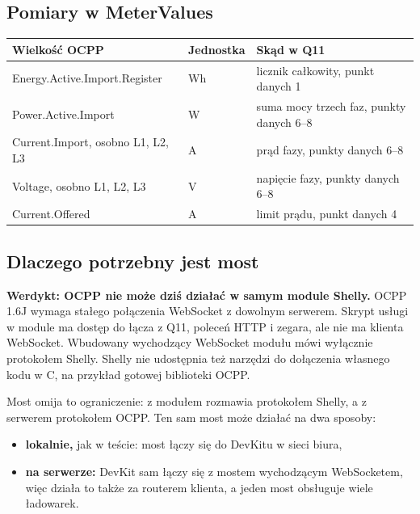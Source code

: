 \documentclass[11pt,a4paper]{article}
\begin{document}
\subsection{Pomiary w MeterValues}

\begin{longtable}{>{\raggedright\arraybackslash}p{5.98cm}>{\raggedright\arraybackslash}p{1.82cm}>{\raggedright\arraybackslash}p{7.48cm}}
\toprule
\rowcolor{apteallight}\textbf{Wielkość OCPP} & \textbf{Jednostka} & \textbf{Skąd w Q11} \\
\midrule\endhead
\bottomrule\endfoot
Energy.Active.Import.Register & Wh & licznik całkowity, punkt danych 1 \\
Power.Active.Import & W & suma mocy trzech faz, punkty danych 6–8 \\
Current.Import, osobno L1, L2, L3 & A & prąd fazy, punkty danych 6–8 \\
Voltage, osobno L1, L2, L3 & V & napięcie fazy, punkty danych 6–8 \\
Current.Offered & A & limit prądu, punkt danych 4 \\
\end{longtable}

\clearpage

\subsection{Dlaczego potrzebny jest most}

\textbf{Werdykt: OCPP nie może dziś działać w samym module Shelly.} OCPP 1.6J wymaga stałego połączenia WebSocket z dowolnym serwerem. Skrypt usługi w module ma dostęp do łącza z Q11, poleceń HTTP i zegara, ale nie ma klienta WebSocket. Wbudowany wychodzący WebSocket modułu mówi wyłącznie protokołem Shelly. Shelly nie udostępnia też narzędzi do dołączenia własnego kodu w C, na przykład gotowej biblioteki OCPP.


Most omija to ograniczenie: z modułem rozmawia protokołem Shelly, a z serwerem protokołem OCPP. Ten sam most może działać na dwa sposoby:

\begin{itemize}
\item \textbf{lokalnie,} jak w teście: most łączy się do DevKitu w sieci biura,
\item \textbf{na serwerze:} DevKit sam łączy się z mostem wychodzącym WebSocketem, więc działa to także za routerem klienta, a jeden most obsługuje wiele ładowarek.
\end{itemize}
\end{document}
